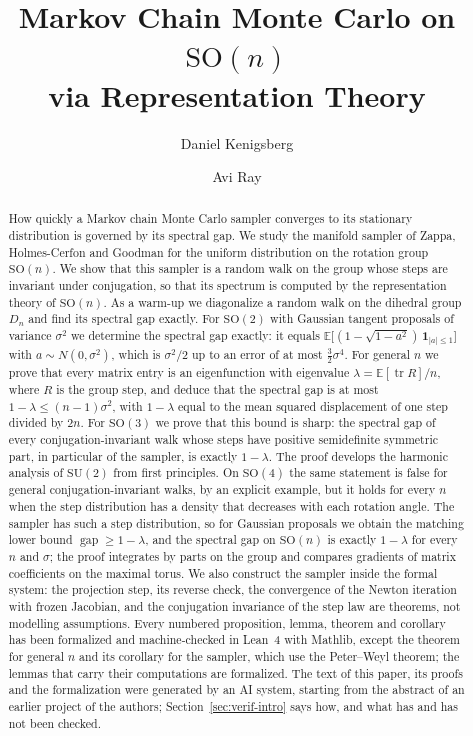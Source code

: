 \documentclass[11pt]{amsart}
\title[MCMC on $\mathrm{SO}(n)$ via representation theory]{Markov Chain Monte Carlo on $\mathrm{SO}(n)$\\ via Representation Theory}
\author{Daniel Kenigsberg}
\author{Avi Ray}
\theoremstyle{definition}
\theoremstyle{remark}
\newcommand{\E}{\mathbb{E}}
\newcommand{\SO}{\mathrm{SO}}
\newcommand{\tr}{\operatorname{tr}}
\newcommand{\one}{\mathbf{1}}
\newcommand{\gap}{\operatorname{gap}}
\begin{document}
\begin{abstract}
How quickly a Markov chain Monte Carlo sampler converges to its stationary distribution is
governed by its spectral gap.  We study the manifold sampler of Zappa, Holmes-Cerfon and Goodman
for the uniform distribution on the rotation group $\SO(n)$.  We show that this sampler is a
random walk on the group whose steps are invariant under conjugation, so that its spectrum is
computed by the representation theory of $\SO(n)$.  As a warm-up we diagonalize a random walk on
the dihedral group $D_n$ and find its spectral gap exactly.  For $\SO(2)$ with Gaussian tangent
proposals of variance $\sigma^2$ we determine the spectral gap exactly: it equals
$\E\bigl[(1-\sqrt{1-a^2})\,\one_{|a|\le 1}\bigr]$ with $a\sim N(0,\sigma^2)$, which is
$\sigma^2/2$ up to an error of at most $\tfrac32\sigma^4$.  For general $n$ we prove that every
matrix entry is an eigenfunction with eigenvalue $\lambda=\E[\tr R]/n$, where $R$ is the group
step, and deduce that the spectral gap is at most $1-\lambda\le (n-1)\sigma^2$, with
$1-\lambda$ equal to the mean squared displacement of one step divided by $2n$.  For $\SO(3)$ we
prove that this bound is sharp: the spectral gap of every conjugation-invariant walk whose steps
have positive semidefinite symmetric part, in particular of the sampler, is exactly
$1-\lambda$.  The proof develops the harmonic analysis of $\mathrm{SU}(2)$ from first principles.
On $\SO(4)$ the same statement is false for general conjugation-invariant walks, by an explicit
example, but it holds for every $n$ when the step distribution has a density that decreases
with each rotation angle.  The sampler has such a step distribution, so for Gaussian proposals we
obtain the matching lower bound $\gap\ge1-\lambda$, and the spectral gap on $\SO(n)$ is exactly
$1-\lambda$ for every $n$ and $\sigma$; the proof integrates by parts on the group and compares
gradients of matrix coefficients on the maximal torus.  We
also construct the sampler inside the formal system: the projection step, its reverse check, the
convergence of the Newton iteration with frozen Jacobian, and the conjugation invariance of the
step law are theorems, not modelling assumptions.  Every numbered proposition, lemma, theorem
and corollary has been formalized and machine-checked in Lean~4 with Mathlib, except the theorem
for general $n$ and its corollary for the sampler, which use the Peter--Weyl theorem; the lemmas
that carry their computations are formalized.  The text of this paper, its proofs and the
formalization were generated by an AI system, starting from the abstract of an earlier project
of the authors; Section~\ref{sec:verif-intro} says how, and what has and has not been checked.
\end{abstract}
\end{document}

